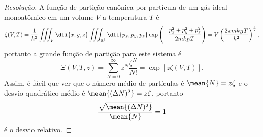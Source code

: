 \begin{proof}[Resolução]
    A função de partição canônica por partícula de um gás ideal monoatômico em um volume \(V\) a temperatura \(T\) é
    \begin{equation*}
        \zeta(V, T) = \frac{1}{h^3} \iiint_{V} \dli{x,y,z}\iiint_{\mathbb{R}^3} \dli{p_x,p_y,p_z} \exp{\left(-\frac{p_x^2 + p_y^2 + p_z^2}{2mk_B T}\right)} = V\left(\frac{2\pi m k_BT}{h^2}\right)^{\frac32},
    \end{equation*}
    portanto a grande função de partição para este sistema é
    \begin{equation*}
        \Xi(V, T, z) = \sum_{N = 0}^\infty z^N \frac{\zeta^N}{N!} = \exp[z \zeta(V, T)].
    \end{equation*}
    Assim, é fácil que ver que o número médio de partículas é \(\mean{N} = z \zeta\) e o desvio quadrático médio é \(\mean{(\Delta N)^2} = z \zeta\), portanto
    \begin{equation*}
        \frac{\sqrt{\mean{(\Delta N)^2}}}{\mean{N}} = 1
    \end{equation*}
    é o desvio relativo.
\end{proof}
